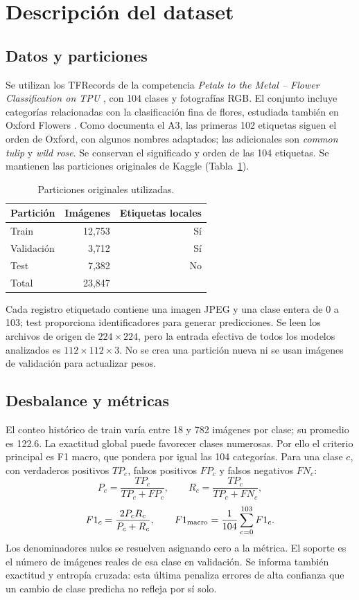 \section{Descripción del dataset}
\subsection{Datos y particiones}
Se utilizan los TFRecords de la competencia \textit{Petals to the Metal -- Flower
Classification on TPU} \citep{kagglePetalsMetal}, con 104 clases y fotografías
RGB. El conjunto incluye categorías relacionadas con la clasificación fina de
flores, estudiada también en Oxford Flowers \citep{nilsback2008}. Como documenta
el A3, las primeras 102 etiquetas siguen el orden de Oxford, con algunos nombres
adaptados; las adicionales son \textit{common tulip} y \textit{wild rose}.
Se conservan el significado y orden de las 104 etiquetas. Se mantienen
las particiones originales de Kaggle (Tabla~\ref{tab:particiones}).
\begin{table}[htbp]
\centering\small
\caption{Particiones originales utilizadas.}\label{tab:particiones}
\begin{tabular}{lrr}
\toprule Partición & Imágenes & Etiquetas locales \\
\midrule Train & 12,753 & Sí \\ Validación & 3,712 & Sí \\
Test & 7,382 & No \\ Total & 23,847 & \\
\bottomrule
\end{tabular}
\end{table}
Cada registro etiquetado contiene una imagen JPEG y una clase entera de 0 a 103;
test proporciona identificadores para generar predicciones. Se leen los archivos
de origen de $224\times224$, pero la entrada efectiva de todos los modelos
analizados es $112\times112\times3$. No se crea una partición nueva ni se usan
imágenes de validación para actualizar pesos.

\subsection{Desbalance y métricas}
El conteo histórico de train varía entre 18 y 782 imágenes por clase; su promedio
es 122.6. La exactitud global puede favorecer clases numerosas. Por ello el
criterio principal es F1 macro, que pondera por igual las 104 categorías.
Para una clase $c$, con verdaderos positivos $TP_c$, falsos positivos $FP_c$
y falsos negativos $FN_c$:
\begin{equation}
P_c=\frac{TP_c}{TP_c+FP_c},\qquad R_c=\frac{TP_c}{TP_c+FN_c},
\end{equation}
\begin{equation}
F1_c=\frac{2P_cR_c}{P_c+R_c},\qquad F1_{\rm macro}=\frac{1}{104}\sum_{c=0}^{103}F1_c.
\end{equation}
Los denominadores nulos se resuelven asignando cero a la métrica. El soporte es
el número de imágenes reales de esa clase en validación. Se informa también
exactitud y entropía cruzada: esta última penaliza errores de alta confianza
que un cambio de clase predicha no refleja por sí solo.
